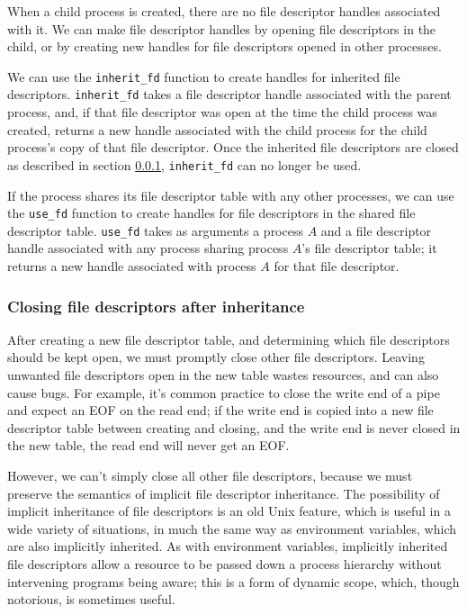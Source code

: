 \documentclass[letterpaper,twocolumn,10pt]{article}
\begin{document}
When a child process is created,
there are no file descriptor handles associated with it.
We can make file descriptor handles by opening file descriptors in the child,
or by creating new handles for file descriptors opened in other processes.

We can use the \verb|inherit_fd| function to create handles for inherited file descriptors.
\verb|inherit_fd| takes a file descriptor handle associated with the parent process,
and, if that file descriptor was open at the time the child process was created,
returns a new handle associated with the child process
for the child process's copy of that file descriptor.
Once the inherited file descriptors are closed as described in section \ref{cloexec},
\verb|inherit_fd| can no longer be used.

If the process shares its file descriptor table with any other processes,
we can use the \verb|use_fd| function to create handles for file descriptors
in the shared file descriptor table.
\verb|use_fd| takes as arguments a process $A$
and a file descriptor handle associated with any process sharing process $A$'s file descriptor table;
it returns a new handle associated with process $A$ for that file descriptor.
\subsubsection{Closing file descriptors after inheritance}\label{cloexec}
After creating a new file descriptor table,
and determining which file descriptors should be kept open,
we must promptly close other file descriptors.
Leaving unwanted file descriptors open in the new table wastes resources,
and can also cause bugs.
For example, it's common practice to close the write end of a pipe
and expect an EOF on the read end;
if the write end is copied into a new file descriptor table between creating and closing,
and the write end is never closed in the new table,
the read end will never get an EOF.

However, we can't simply close all other file descriptors,
because we must preserve the semantics of implicit file descriptor inheritance.
The possibility of implicit inheritance of file descriptors is an old Unix feature,
which is useful in a wide variety of situations,
in much the same way as environment variables, which are also implicitly inherited.
As with environment variables,
implicitly inherited file descriptors allow a resource to be passed down a process hierarchy
without intervening programs being aware;
this is a form of dynamic scope, which, though notorious, is sometimes useful.\cite{implicit_params}
\end{document}
